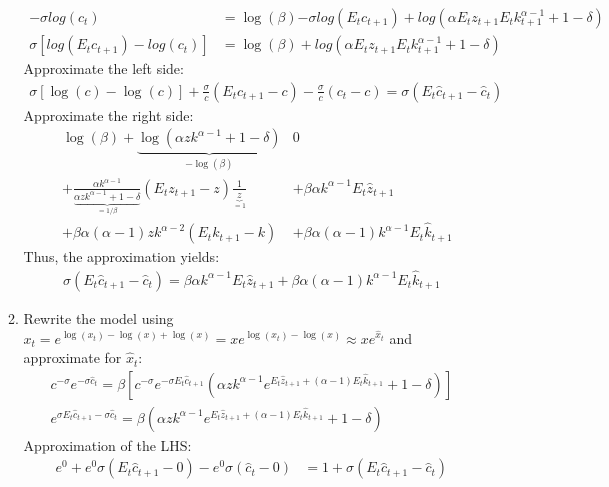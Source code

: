 \documentclass{article}
\begin{document}
\begin{enumerate}[(a)]
\begin{enumerate}[(1)]
\begin{align*}
    {-\sigma}log(c_t) &= \log(\beta) {-\sigma}log(E_t c_{t+1}) + log(\alpha E_t z_{t+1} E_t k_{t+1}^{\alpha-1} +1-\delta)\\
    {\sigma} \left[log(E_tc_{t+1}) - log(c_t)\right] &= \log(\beta) + log(\alpha E_t z_{t+1} E_t k_{t+1}^{\alpha-1} +1-\delta)
    \end{align*}
    Approximate the left side:
    \begin{align*}
    \sigma \left[\log(c)-\log(c)\right] + \frac{\sigma}{c}\left(E_t c_{t+1}-c\right) - \frac{\sigma}{c}\left(c_{t}-c\right)= \sigma \left( E_t \widehat{c}_{t+1} - \widehat{c}_t\right)
    \end{align*}
    Approximate the right side:
    \begin{align*}
      &\log(\beta) +\underbrace{\log(\alpha z k^{\alpha-1} + 1 -\delta)}_{-\log(\beta)} & 0\\
      &+ \frac{\alpha k^{\alpha-1}}{\underbrace{\alpha z k^{\alpha-1} + 1 -\delta}_{=1/\beta}} (E_t z_{t+1}-z) \frac{1}{\underbrace{z}_{=1}} &+\beta \alpha k^{\alpha-1} E_t \widehat{z}_{t+1}\\
      &+ \beta \alpha (\alpha-1) z k^{\alpha-2} (E_t k_{t+1}-k) & + \beta \alpha (\alpha-1) k^{\alpha-1} E_t \widehat{k}_{t+1}
    \end{align*}
    Thus, the approximation yields:
    \begin{align*}
      \sigma \left( E_t \widehat{c}_{t+1} - \widehat{c}_t\right) = \beta \alpha k^{\alpha-1} E_t \widehat{z}_{t+1} + \beta \alpha (\alpha-1) k^{\alpha-1} E_t \widehat{k}_{t+1}
    \end{align*}
    \item Rewrite the model using $x_t = e^{\log(x_t)-\log(x)+\log(x)} = x e^{\log(x_t)-\log(x)} \approx x e^{\widehat{x}_t}$ and approximate for $\widehat{x}_t$:
    \begin{align*}
      c^{-\sigma} e^{-\sigma \widehat{c}_t} = \beta  \left[ c^{-\sigma} e^{-\sigma E_t\widehat{c}_{t+1}}\left(\alpha z k^{\alpha-1}e^{E_t \widehat{z}_{t+1}+(\alpha-1)E_t \widehat{k}_{t+1}} +1 -\delta\right) \right]\\
       e^{\sigma E_t \widehat{c}_{t+1} -\sigma \widehat{c}_t} = \beta  \left(\alpha z k^{\alpha-1}e^{E_t \widehat{z}_{t+1}+(\alpha-1)E_t \widehat{k}_{t+1}} +1 -\delta\right)
    \end{align*}
    Approximation of the LHS:
    \begin{align*}
     e^0 + e^0 \sigma (E_t\widehat{c}_{t+1}-0) - e^0 \sigma (\widehat{c}_{t}-0) & = 1 + \sigma (E_t\widehat{c}_{t+1} -\widehat{c}_{t} )

\end{align*}
\end{enumerate}
\end{enumerate}
\end{document}
